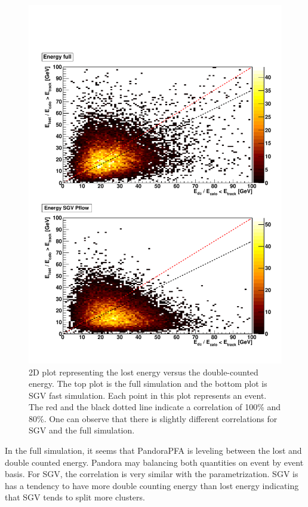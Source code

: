 \begin{figure}[htbp!]
  \centering
  \includegraphics[width=1\linewidth]{../Thesis_Plots/SGV/Plots/Correlation_nojet.pdf}
  \caption{2D plot representing the lost energy versus the double-counted energy. The top plot is the full simulation and the bottom plot is SGV fast simulation. Each point in this plot represents an event. The red and the black dotted line indicate a correlation of 100\% and 80\%. One can observe that there is slightly different correlations for SGV and the full simulation.}
  \label{fig:cluster_track_level}
\end{figure}

In the full simulation, it seems that PandoraPFA is leveling between the lost and double counted energy. Pandora may balancing both quantities on event by event basis. For SGV, the correlation is very similar with the parametrization. SGV is has a tendency to have more double counting energy than lost energy indicating that SGV tends to split more clusters.

